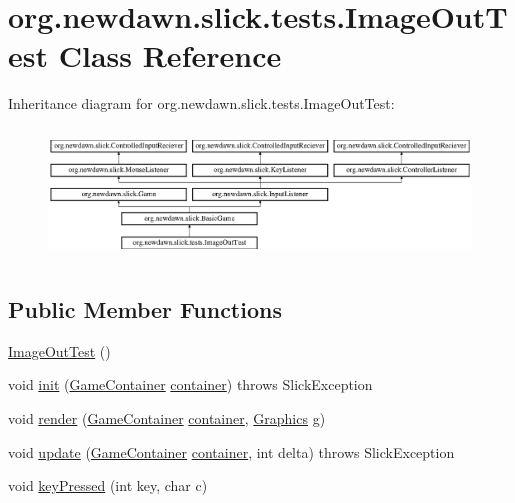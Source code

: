 \hypertarget{classorg_1_1newdawn_1_1slick_1_1tests_1_1_image_out_test}{}\section{org.\+newdawn.\+slick.\+tests.\+Image\+Out\+Test Class Reference}
\label{classorg_1_1newdawn_1_1slick_1_1tests_1_1_image_out_test}
Inheritance diagram for org.\+newdawn.\+slick.\+tests.\+Image\+Out\+Test\+:\begin{figure}[H]
\begin{center}
\leavevmode
\includegraphics[height=3.522012cm]{classorg_1_1newdawn_1_1slick_1_1tests_1_1_image_out_test}
\end{center}
\end{figure}
\subsection*{Public Member Functions}
\begin{DoxyCompactItemize}
\item 
\mbox{\hyperlink{classorg_1_1newdawn_1_1slick_1_1tests_1_1_image_out_test_a270f7938a765d916248533df619a3191}{Image\+Out\+Test}} ()
\item 
void \mbox{\hyperlink{classorg_1_1newdawn_1_1slick_1_1tests_1_1_image_out_test_a988f0eb61fa3552f9f3d2ae61345475b}{init}} (\mbox{\hyperlink{classorg_1_1newdawn_1_1slick_1_1_game_container}{Game\+Container}} \mbox{\hyperlink{classorg_1_1newdawn_1_1slick_1_1tests_1_1_image_out_test_a09db11b63df42087043028eceef5d69a}{container}})  throws Slick\+Exception 
\item 
void \mbox{\hyperlink{classorg_1_1newdawn_1_1slick_1_1tests_1_1_image_out_test_a295298e572c7b97f530d2bdce659b9c6}{render}} (\mbox{\hyperlink{classorg_1_1newdawn_1_1slick_1_1_game_container}{Game\+Container}} \mbox{\hyperlink{classorg_1_1newdawn_1_1slick_1_1tests_1_1_image_out_test_a09db11b63df42087043028eceef5d69a}{container}}, \mbox{\hyperlink{classorg_1_1newdawn_1_1slick_1_1_graphics}{Graphics}} \mbox{\hyperlink{classorg_1_1newdawn_1_1slick_1_1tests_1_1_image_out_test_a0007b2187e2d4d26bdb2d90b39c62479}{g}})
\item 
void \mbox{\hyperlink{classorg_1_1newdawn_1_1slick_1_1tests_1_1_image_out_test_a2ad0819a415d35df9176c54e4fd54d78}{update}} (\mbox{\hyperlink{classorg_1_1newdawn_1_1slick_1_1_game_container}{Game\+Container}} \mbox{\hyperlink{classorg_1_1newdawn_1_1slick_1_1tests_1_1_image_out_test_a09db11b63df42087043028eceef5d69a}{container}}, int delta)  throws Slick\+Exception 
\item 
void \mbox{\hyperlink{classorg_1_1newdawn_1_1slick_1_1tests_1_1_image_out_test_ae35bb720ba0ef09a785a6e58d0b86982}{key\+Pressed}} (int key, char c)
\end{DoxyCompactItemize}
